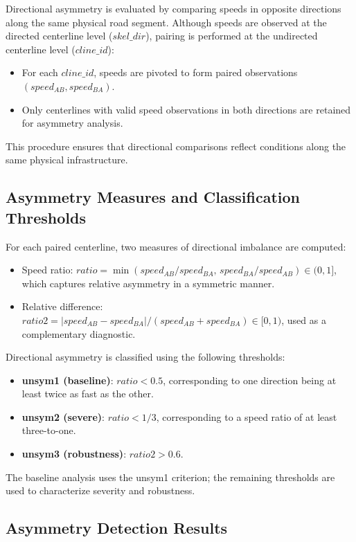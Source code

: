 \documentclass[12pt]{article}
\begin{document}
	Directional asymmetry is evaluated by comparing speeds in opposite directions along the same physical road segment. Although speeds are observed at the directed centerline level ($skel\_dir$), pairing is performed at the undirected centerline level ($cline\_id$):
	\begin{itemize}
		\item For each $cline\_id$, speeds are pivoted to form paired observations $(speed_{AB}, speed_{BA})$.
		\item Only centerlines with valid speed observations in both directions are retained for asymmetry analysis.
	\end{itemize}
	This procedure ensures that directional comparisons reflect conditions along the same physical infrastructure.
	
	\subsection{Asymmetry Measures and Classification Thresholds}
	
	For each paired centerline, two measures of directional imbalance are computed:
	\begin{itemize}
		\item Speed ratio: $ratio = \min(speed_{AB}/speed_{BA},\, speed_{BA}/speed_{AB}) \in (0,1]$, which captures relative asymmetry in a symmetric manner.
		\item Relative difference: $ratio2 = |speed_{AB} - speed_{BA}| / (speed_{AB} + speed_{BA}) \in [0,1)$, used as a complementary diagnostic.
	\end{itemize}
	
	Directional asymmetry is classified using the following thresholds:
	\begin{itemize}
		\item \textbf{unsym1 (baseline)}: $ratio < 0.5$, corresponding to one direction being at least twice as fast as the other.
		\item \textbf{unsym2 (severe)}: $ratio < 1/3$, corresponding to a speed ratio of at least three-to-one.
		\item \textbf{unsym3 (robustness)}: $ratio2 > 0.6$.
	\end{itemize}
	The baseline analysis uses the unsym1 criterion; the remaining thresholds are used to characterize severity and robustness.
	
	\subsection{Asymmetry Detection Results}
	
\end{document}
